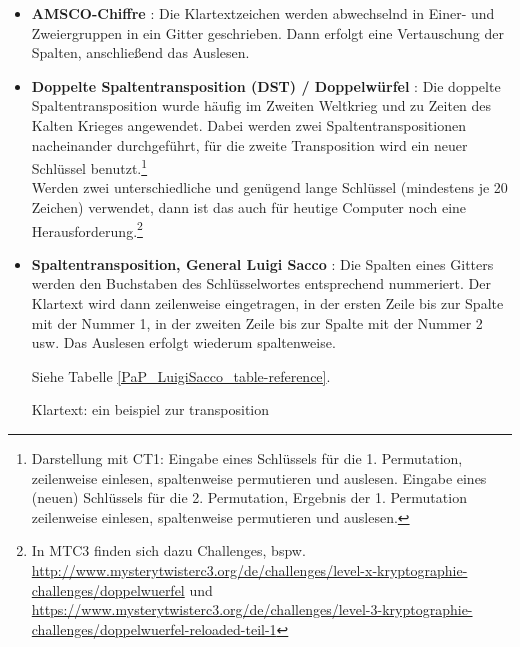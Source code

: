\begin{refsegment}
\begin{itemize}
   Transpositionsschlüssel: K=2; E=1; Y=3. \\
   Geheimtext: IEPLR APIOE BSEUR SSINI IZTNO TN \\


\item {\bf AMSCO-Chiffre} \cite{ACA2002}: Die Klartextzeichen
   werden abwechselnd in Einer- und Zweiergruppen in ein Gitter geschrieben.
   Dann erfolgt eine Vertauschung der Spalten, anschließend das Auslesen.


\item {\bf Doppelte Spaltentransposition (DST) / \glqq Doppelwürfel\grqq}
   \cite{Savard1999}:
   Die doppelte
   Spaltentransposition wurde häufig im Zweiten Weltkrieg und zu Zeiten des
   Kalten Krieges angewendet. Dabei werden zwei Spaltentranspositionen
   nacheinander durchgeführt, für die zweite Transposition wird ein neuer
   Schlüssel benutzt.\footnote{%
   Darstellung mit CT1: Eingabe eines Schlüssels für die 1. Permutation,
   zeilenweise einlesen, spaltenweise permutieren und auslesen.
   Eingabe eines (neuen) Schlüssels für die 2. Permutation, Ergebnis der
   1. Permutation zeilenweise einlesen, spaltenweise permutieren und
   auslesen.
   }\\
   Werden zwei unterschiedliche und genügend lange Schlüssel (mindestens je 20
   Zeichen) verwendet, dann ist das auch für heutige Computer noch eine
   Herausforderung.\footnote{%
     In MTC3 finden sich dazu Challenges, bspw.\\
     \url{http://www.mysterytwisterc3.org/de/challenges/level-x-kryptographie-challenges/doppelwuerfel} und\\
     \url{https://www.mysterytwisterc3.org/de/challenges/level-3-kryptographie-challenges/doppelwuerfel-reloaded-teil-1}
   }


\item {\bf Spaltentransposition, General Luigi Sacco} \cite{Savard1999}: Die
   Spalten eines Gitters werden den Buchstaben des Schlüsselwortes
   entsprechend nummeriert. Der Klartext wird dann zeilenweise eingetragen,
   in der ersten Zeile bis zur Spalte mit der Nummer 1, in der zweiten Zeile
   bis zur Spalte mit der Nummer 2 usw. Das Auslesen erfolgt wiederum
   spaltenweise.

   Siehe Tabelle \ref{PaP_LuigiSacco_table-reference}.

   Klartext: ein beispiel zur transposition


\end{itemize}
\end{refsegment}

